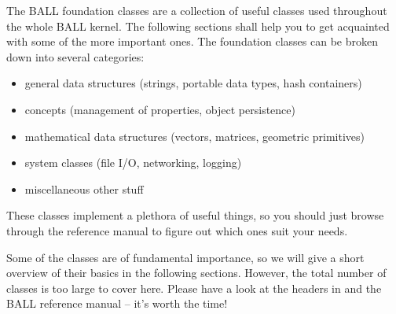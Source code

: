 \label{section:kernel-data-structures}

\noindent
The BALL foundation classes are a collection of useful classes used throughout
the whole BALL kernel. The following sections shall help you to get acquainted
with some of the more important ones. The foundation classes can be broken down
into several categories:
\begin{itemize}
  \item general data structures (\eg strings, portable data types, hash
	containers)
  \item concepts (\eg management of properties, object persistence)
  \item mathematical data structures (\eg vectors, matrices, geometric
        primitives)
  \item system classes (file I/O, networking, logging)
  \item miscellaneous other stuff
\end{itemize}
These classes implement a plethora of useful things, so you should just browse
through the reference manual to figure out which ones suit your needs. 

Some of the classes are of fundamental importance, so we will give a short
overview of their basics in the following sections. However, the total number
of classes is too large to cover here. Please have a look at the headers in 
 and the
BALL reference manual -- it's worth the time!

